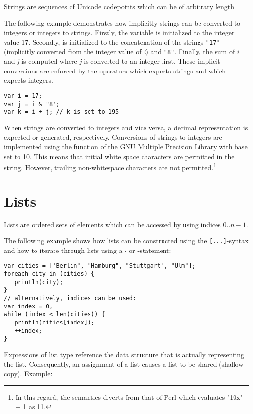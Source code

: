 Strings are sequences of Unicode codepoints which can be of arbitrary length.

The following example demonstrates how implicitly strings can be
converted to integers or integers to strings. Firstly, the variable
 is initialized to the integer value 17. Secondly, 
is initialized to the concatenation of the strings \lstinline!"17"!
(implicitly converted from the integer value of \textit{i}) and
\lstinline!"8"!. Finally, the sum of \textit{i} and \textit{j} is
computed where \textit{j} is converted to an integer first. These
implicit conversions are enforced by the operators \token{\&}
which expects strings and \token{+} which expects integers.

\begin{lstlisting}
var i = 17;
var j = i & "8";
var k = i + j; // k is set to 195
\end{lstlisting}

When strings are converted to integers and vice versa,
a decimal representation is expected or generated, respectively.
Conversions of strings to integers are implemented using
the  function of the
GNU Multiple Precision Library
with base set to 10. This means that initial white space characters are
permitted in the string. However, trailing non-whitespace characters
are not permitted.\footnote{In this regard, the semantics diverts from that of
Perl which evaluates "10x" + 1 as 11.}

\section{Lists}

Lists are ordered sets of elements which can be accessed by
using indices $0..n-1$.

The following example shows how lists can be constructed
using the \lstinline![...]!-syntax and how to iterate through
lists using a - or -statement:

\begin{lstlisting}
var cities = ["Berlin", "Hamburg", "Stuttgart", "Ulm"];
foreach city in (cities) {
   println(city);
}
// alternatively, indices can be used:
var index = 0;
while (index < len(cities)) {
   println(cities[index]);
   ++index;
}
\end{lstlisting}

\noindent
Expressions of list type reference the data structure that is
actually representing the list. Consequently,
an assignment of a list causes a list to be shared
(shallow copy). Example:

